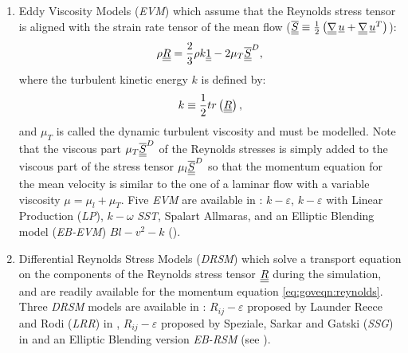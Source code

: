\begin{enumerate}[ label=\roman{*}/, ref=(\roman{*})]
\item Eddy Viscosity Models (\emph{EVM}) which assume that the Reynolds stress tensor is aligned with
the strain rate tensor of the mean flow ($\overline{\underline{\underline{S}}} \equiv \frac{1}{2} \left( \underline{\underline{{\nabla}}} \, \underline{u}+ \underline{\underline{{\nabla}}} \, \underline{u}^T \right)$):
%
\begin{equation}\label{eq:goveqn:evm_hypothesis}
\rho \underline{\underline{R}} = \dfrac{2}{3}\rho  k \underline{\underline{1}} - 2 \mu_T \overline{\underline{\underline{S}}}^D,
\end{equation}
where the turbulent kinetic energy $k$ is defined by:
%
\begin{equation}\label{eq:goveqn:tke_def}
k \equiv \dfrac{1}{2} tr \left( \underline{\underline{R}}\right),
\end{equation}
and $\mu_T$ is called the dynamic turbulent viscosity and must be modelled.
Note that the viscous part $\mu_T\overline{\underline{\underline{S}}}^D$ of the Reynolds stresses is simply added to the viscous part of the
stress tensor $\mu_l\overline{\underline{\underline{S}}}^D$ so that the momentum equation for the mean velocity is similar to the one of a laminar
flow with a variable viscosity $\mu = \mu_l +\mu_T$.
 Five \emph{EVM} are available in \CS:
$k-\varepsilon$, $k-\varepsilon$ with Linear Production (\emph{LP}), $k-\omega$ \emph{SST}, Spalart Allmaras, and an Elliptic Blending model (\emph{EB-EVM}) $Bl-v^2-k$ (\cite{Billard:2012}).

\item Differential Reynolds Stress Models (\emph{DRSM}) which solve
a transport equation on the components of the Reynolds stress tensor $\underline{\underline{R}}$
during the simulation, and are readily available for the momentum
equation \eqref{eq:goveqn:reynolds}. Three \emph{DRSM} models are available in \CS: $R_{ij}-\varepsilon$ proposed by Launder Reece and Rodi (\emph{LRR}) in \cite{Launder:1975},
$R_{ij}-\varepsilon$ proposed by Speziale, Sarkar and Gatski (\emph{SSG}) in \cite{Speziale:1991} and an Elliptic Blending version \emph{EB-RSM} (see \cite{Manceau:2002}).
%

\end{enumerate}


